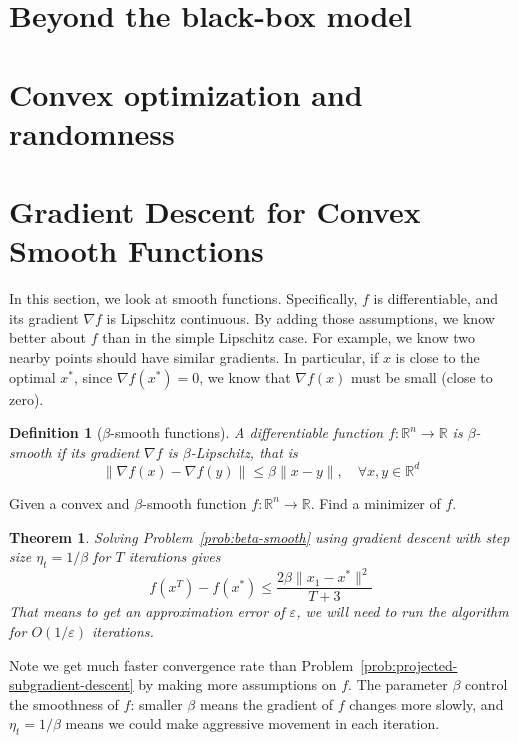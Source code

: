 \documentclass{scrartcl}
\newtheorem{theorem}{Theorem}
\newtheorem{definition}{Definition}
\newcommand{\RR}{\mathbb{R}}
\begin{document}
\section{Beyond the black-box model}
\section{Convex optimization and randomness}


\section{Gradient Descent for Convex Smooth Functions}

In this section, we look at smooth functions. Specifically, $f$ is differentiable, and its gradient
$\nabla f$ is Lipschitz continuous. By adding those assumptions, we know better about $f$ than in
the simple Lipschitz case. For example, we know two nearby points should have similar gradients.
In particular, if $x$ is close to the optimal $x^*$, since $\nabla f(x^*)=0$, we know that $\nabla
f(x)$ must be small (close to zero).

\begin{definition}[$\beta$-smooth functions]
A differentiable function $f:\RR^n\rightarrow \RR$ is $\beta$-smooth if its gradient $\nabla f$ is
$\beta$-Lipschitz, that is
\begin{equation}
  \|\nabla f(x)-\nabla f(y)\| \leq \beta \|x-y\|,\quad \forall x,y\in\RR^d
\end{equation}
\end{definition}

\begin{problem}
  Given a convex and $\beta$-smooth function $f:\RR^n\rightarrow\RR$. Find a minimizer of $f$.
  \label{prob:beta-smooth}
\end{problem}

\begin{theorem}
  Solving Problem~\ref{prob:beta-smooth} using gradient descent with step size $\eta_t=1/\beta$ for
  $T$ iterations gives
  \begin{equation}
    f(x^T)-f(x^*) \leq \frac{2\beta \|x_1-x^*\|^2}{T+3}
  \end{equation}
  That means to get an approximation error of $\varepsilon$, we will need to run the algorithm for
  $O(1/\varepsilon)$ iterations.
  \label{thm:beta-smooth}
\end{theorem}
Note we get much faster convergence rate than Problem~\ref{prob:projected-subgradient-descent} by
making more assumptions on $f$. The parameter $\beta$ control the smoothness of $f$: smaller $\beta$
means the gradient of $f$ changes more slowly, and $\eta_t=1/\beta$ means we could make aggressive
movement in each iteration.
\end{document}
